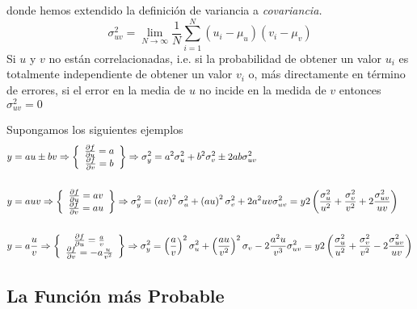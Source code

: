 \documentclass[spanish,titlepage,11pt]{article}
\begin{document}
donde hemos extendido la definici\'{o}n de variancia a \textit{covariancia.}
\[
\sigma_{uv}^{2}=\lim_{N\rightarrow\infty}\frac{1}{N}\sum_{i=1}^{N}\left(
u_{i}-\mu_{u}\right)  \left(  v_{i}-\mu_{v}\right)
\]
Si $u$ y $v$ no est\'{a}n correlacionadas, i.e. si la probabilidad de obtener
un valor $u_{i}$ es totalmente independiente de obtener un valor $v_{i}$ o,
m\'{a}s directamente en t\'{e}rmino de errores, si el error en la media de $u$
no incide en la medida de $v$ entonces $\sigma_{uv}^{2}=0$

Supongamos los siguientes ejemplos
\begin{align*}
y  &  =au\pm bv\Rightarrow\left\{
\begin{array}
[c]{c}%
\frac{\partial f}{\partial u}=a\\
\frac{\partial f}{\partial v}=b
\end{array}
\right\}  \Rightarrow\sigma_{y}^{2}=a^{2}\sigma_{u}^{2}+b^{2}\sigma_{v}^{2}%
\pm2ab\sigma_{uv}^{2}\\
& \\
y  &  =auv\Rightarrow\left\{
\begin{array}
[c]{c}%
\frac{\partial f}{\partial u}=av\\
\frac{\partial f}{\partial v}=au
\end{array}
\right\}  \Rightarrow\sigma_{y}^{2}=\left(  av\right)  ^{2}\sigma_{u}%
^{2}+\left(  au\right)  ^{2}\sigma_{v}^{2}+2a^{2}uv\sigma_{uv}^{2}=y2\left(
\frac{\sigma_{u}^{2}}{u^{2}}+\frac{\sigma_{v}^{2}}{v^{2}}+2\frac{\sigma
_{uv}^{2}}{uv}\right) \\
& \\
y  &  =a\frac{u}{v}\Rightarrow\left\{
\begin{array}
[c]{c}%
\frac{\partial f}{\partial u}=\frac{a}{v}\\
\frac{\partial f}{\partial v}=-a\frac{u}{v^{2}}%
\end{array}
\right\}  \Rightarrow\sigma_{y}^{2}=\left(  \frac{a}{v}\right)  ^{2}\sigma
_{u}^{2}+\left(  \frac{au}{v^{2}}\right)  ^{2}\sigma_{v}-2\frac{a^{2}u}{v^{3}%
}\sigma_{uv}^{2}=y2\left(  \frac{\sigma_{u}^{2}}{u^{2}}+\frac{\sigma_{v}^{2}%
}{v^{2}}-2\frac{\sigma_{uv}^{2}}{uv}\right)
\end{align*}

\subsection{La Funci\'{o}n m\'{a}s Probable}
\end{document}
